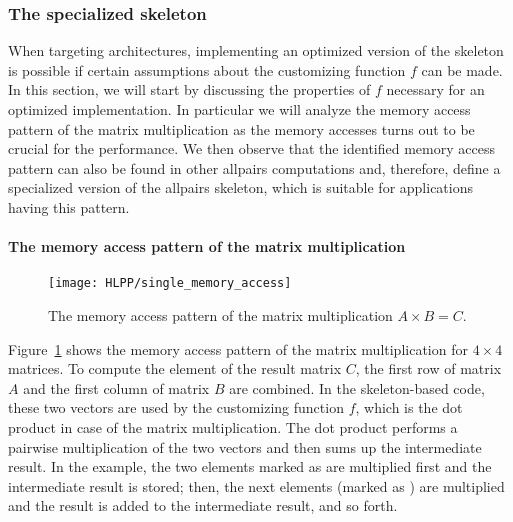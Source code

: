 \subsubsection{The specialized \allpairs skeleton}
\label{sec:opt_allpairs_skeleton}
When targeting \GPU architectures, implementing an optimized version of the \allpairs skeleton is possible if certain assumptions about the customizing function $f$ can be made.
In this section, we will start by discussing the properties of $f$ necessary for an optimized \GPU implementation.
In particular we will analyze the memory access pattern of the matrix multiplication as the memory accesses turns out to be crucial for the performance.
We then observe that the identified memory access pattern can also be found in other allpairs computations and, therefore, define a specialized version of the allpairs skeleton, which is suitable for applications having this pattern.


\paragraph{The memory access pattern of the matrix multiplication}
\begin{figure}[t]
  \centering
  \texttt{[image: HLPP/single\_memory\_access]}
  \caption{The memory access pattern of the matrix multiplication $A\times B = C$.}
  \label{fig:mm_access_pattern}
\end{figure}
Figure~\ref{fig:mm_access_pattern} shows the memory access pattern of the matrix multiplication for $4\times 4$ matrices.
To compute the element  of the result matrix $C$, the first row of matrix $A$ and the first column of matrix $B$ are combined.
In the skeleton-based code, these two vectors are used by the customizing function $f$, which is the dot product in case of the matrix multiplication.
The dot product performs a pairwise multiplication of the two vectors and then sums up the intermediate result.
In the example, the two elements marked as  are multiplied first and the intermediate result is stored;
then, the next elements (marked as ) are multiplied and the result is added to the intermediate result, and so forth.

